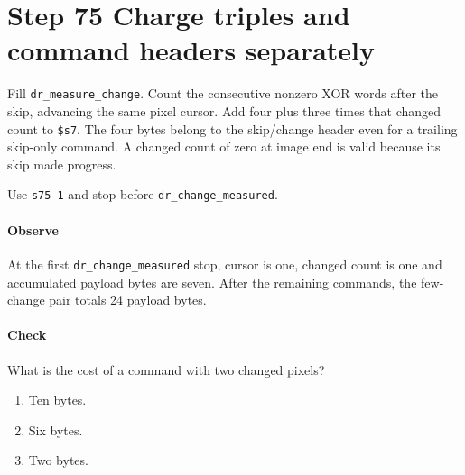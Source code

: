 \section{Step 75 Charge triples and command headers separately}
Fill \texttt{dr\_measure\_change}. Count the consecutive nonzero XOR words after the skip, advancing the same pixel cursor. Add four plus three times that changed count to \texttt{\$s7}. The four bytes belong to the skip/change header even for a trailing skip-only command. A changed count of zero at image end is valid because its skip made progress.

Use \texttt{s75-1} and stop before \texttt{dr\_change\_measured}.

\paragraph{Observe} At the first \texttt{dr\_change\_measured} stop, cursor is one, changed count is one and accumulated payload bytes are seven. After the remaining commands, the few-change pair totals 24 payload bytes.

\paragraph{Check} What is the cost of a command with two changed pixels?
\begin{enumerate}[label=\Alph*.]
  \item Ten bytes.
  \item Six bytes.
  \item Two bytes.
\end{enumerate}
